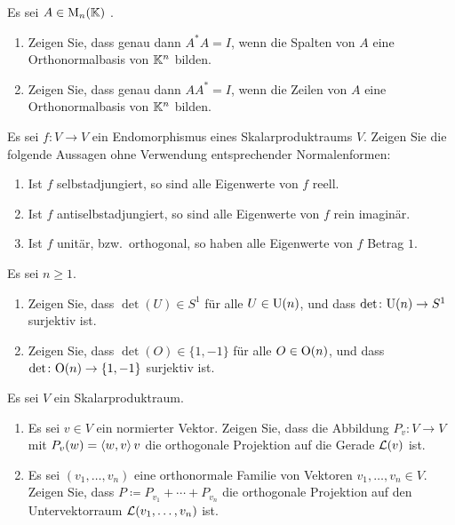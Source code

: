 \documentclass[a4paper, 10pt]{scrartcl}
\begin{document}
\begin{question}
  Es sei $A \in \mathrm{M}_n(\mathbb{K})$ .
  \begin{enumerate}[leftmargin=*]
    \item
      Zeigen Sie, dass genau dann $A^* A = I$, wenn die Spalten von $A$ eine Orthonormalbasis von $\mathbb{K}^n$ bilden.
    \item
      Zeigen Sie, dass genau dann $A A^* = I$, wenn die Zeilen von $A$ eine Orthonormalbasis von $\mathbb{K}^n$ bilden.
  \end{enumerate}
\end{question}


\begin{question}
  Es sei $f \colon V \to V$ ein Endomorphismus eines Skalarproduktraums $V$.
  Zeigen Sie die folgende Aussagen ohne Verwendung entsprechender Normalenformen:
  \begin{enumerate}[leftmargin=*]
    \item
      Ist $f$ selbstadjungiert, so sind alle Eigenwerte von $f$ reell.
    \item
      Ist $f$ antiselbstadjungiert, so sind alle Eigenwerte von $f$ rein imaginär.
    \item
      Ist $f$ unitär, bzw.\ orthogonal, so haben alle Eigenwerte von $f$ Betrag $1$.
  \end{enumerate}
\end{question}


\begin{question}
  Es sei $n \geq 1$.
  \begin{enumerate}[leftmargin=*]
    \item
      Zeigen Sie, dass $\det(U) \in S^1$ für alle $U \in \mathrm{U}(n)$, und dass $\det \colon \mathrm{U}(n) \to S^1$ surjektiv ist.
    \item
      Zeigen Sie, dass $\det(O) \in \{1,-1\}$ für alle $O \in \mathrm{O}(n)$, und dass $\det \colon \mathrm{O}(n) \to \{1,-1\}$ surjektiv ist.
  \end{enumerate}
\end{question}


\begin{question}
  Es sei $V$ ein Skalarproduktraum.
  \begin{enumerate}[leftmargin=*]
    \item
      Es sei $v \in V$ ein normierter Vektor.
      Zeigen Sie, dass die Abbildung $P_v \colon V \to V$ mit $P_v(w) = \left\langle w,v \right\rangle v$ die orthogonale Projektion auf die Gerade $\mathcal{L}(v)$ ist.
    \item
      Es sei $(v_1, \dotsc, v_n)$ eine orthonormale Familie von Vektoren $v_1, \dotsc, v_n \in V$.
      Zeigen Sie, dass $P \coloneqq P_{v_1} + \dotsb + P_{v_n}$ die orthogonale Projektion auf den Untervektorraum $\mathcal{L}(v_1, \dotsc, v_n)$ ist.
  \end{enumerate}
\end{question}
\end{document}
